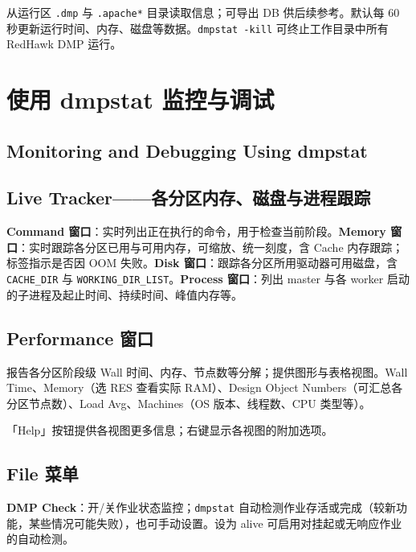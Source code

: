 从运行区 \texttt{.dmp} 与 \texttt{.apache*} 目录读取信息；可导出 DB 供后续参考。默认每 60 秒更新运行时间、内存、磁盘等数据。\texttt{dmpstat -kill} 可终止工作目录中所有 RedHawk DMP 运行。

\section{使用 dmpstat 监控与调试}
\subsection*{Monitoring and Debugging Using dmpstat}

\subsection{Live Tracker——各分区内存、磁盘与进程跟踪}
\textbf{Command 窗口}：实时列出正在执行的命令，用于检查当前阶段。\textbf{Memory 窗口}：实时跟踪各分区已用与可用内存，可缩放、统一刻度，含 Cache 内存跟踪；标签指示是否因 OOM 失败。\textbf{Disk 窗口}：跟踪各分区所用驱动器可用磁盘，含 \texttt{CACHE\_DIR} 与 \texttt{WORKING\_DIR\_LIST}。\textbf{Process 窗口}：列出 master 与各 worker 启动的子进程及起止时间、持续时间、峰值内存等。


\subsection{Performance 窗口}
报告各分区阶段级 Wall 时间、内存、节点数等分解；提供图形与表格视图。Wall Time、Memory（选 RES 查看实际 RAM）、Design Object Numbers（可汇总各分区节点数）、Load Avg、Machines（OS 版本、线程数、CPU 类型等）。


\begin{noteBox}
「Help」按钮提供各视图更多信息；右键显示各视图的附加选项。
\end{noteBox}

\subsection{File 菜单}
\textbf{DMP Check}：开/关作业状态监控；\texttt{dmpstat} 自动检测作业存活或完成（较新功能，某些情况可能失败），也可手动设置。设为 alive 可启用对挂起或无响应作业的自动检测。

